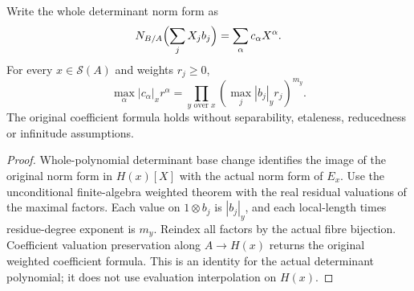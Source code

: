 \begin{theorem}
\label{spectrum:finite-free-weighted-norm}
\leanok
{}
Write the whole determinant norm form as
\[
N_{B/A}\Bigl(\sum_jX_jb_j\Bigr)=\sum_\alpha c_\alpha X^\alpha.
\]
For every $x\in\mathcal S(A)$ and weights $r_j\geq0$,
\[
 \max_\alpha |c_\alpha|_x r^\alpha
 =\prod_{y\text{ over }x}\left(\max_j|b_j|_y r_j\right)^{m_y}.
\]
The original coefficient formula holds without separability, etaleness,
reducedness or infinitude assumptions.
\end{theorem}
\begin{proof}
Whole-polynomial determinant base change identifies the image of the original
norm form in $H(x)[X]$ with the actual norm form of $E_x$.
Use the unconditional finite-algebra weighted theorem with the real residual
valuations of the maximal factors. Each value on $1\otimes b_j$ is
$|b_j|_y$, and each local-length times residue-degree exponent is $m_y$.
Reindex all factors by the actual fibre bijection. Coefficient valuation
preservation along $A\to H(x)$ returns the original weighted coefficient
formula. This is an identity for the actual determinant polynomial; it does
not use evaluation interpolation on $H(x)$.
\end{proof}

